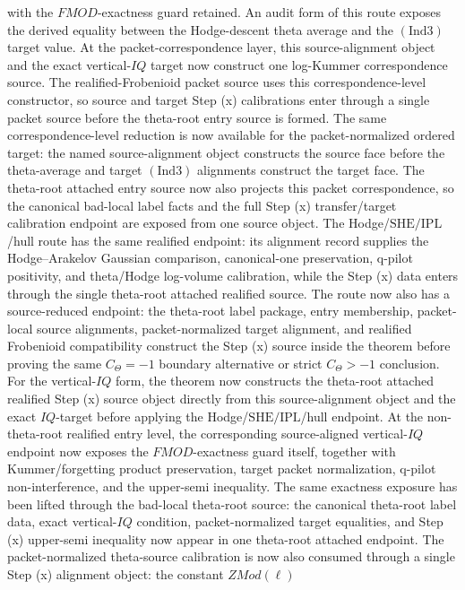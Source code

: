 \documentclass[11pt]{article}
\newcommand{\Ind}{\ensuremath{\mathrm{Ind}}}
\newcommand{\SHE}{\ensuremath{\mathrm{SHE}}}
\newcommand{\IPL}{\ensuremath{\mathrm{IPL}}}
\theoremstyle{plain}
\theoremstyle{definition}
\theoremstyle{remark}
\begin{document}
with the \(FMOD\)-exactness guard retained.
An audit form of this route exposes the derived equality between the
Hodge-descent theta average and the \((\Ind3)\) target value.
At the packet-correspondence layer, this source-alignment object and the exact
vertical-\(IQ\) target now construct one log-Kummer correspondence source.  The
realified-Frobenioid packet source uses this correspondence-level constructor,
so source and target Step (x) calibrations enter through a single packet source
before the theta-root entry source is formed.
The same correspondence-level reduction is now available for the
packet-normalized ordered target: the named source-alignment object constructs
the source face before the theta-average and target \((\Ind3)\) alignments
construct the target face.
The theta-root attached entry source now also projects this packet
correspondence, so the canonical bad-local label facts and the full Step (x)
transfer/target calibration endpoint are exposed from one source object.
The Hodge/\(\SHE/\IPL\)/hull route has the same realified endpoint: its
alignment record supplies the Hodge--Arakelov Gaussian comparison,
canonical-one preservation, q-pilot positivity, and theta/Hodge log-volume
calibration, while the Step (x) data enters through the single theta-root
attached realified source.
The route now also has a source-reduced endpoint: the theta-root label package,
entry membership, packet-local source alignments, packet-normalized target
alignment, and realified Frobenioid compatibility construct the Step (x) source
inside the theorem before proving the same \(C_\Theta=-1\) boundary alternative
or strict \(C_\Theta>-1\) conclusion.
For the vertical-\(IQ\) form, the theorem now constructs the theta-root
attached realified Step (x) source object directly from this source-alignment
object and the exact \(IQ\)-target before applying the
Hodge/\(\SHE/\IPL\)/hull endpoint.
At the non-theta-root realified entry level, the corresponding source-aligned
vertical-\(IQ\) endpoint now exposes the \(FMOD\)-exactness guard itself,
together with Kummer/forgetting product preservation, target packet
normalization, q-pilot non-interference, and the upper-semi inequality.
The same exactness exposure has been lifted through the bad-local theta-root
source: the canonical theta-root label data, exact vertical-\(IQ\) condition,
packet-normalized target equalities, and Step (x) upper-semi inequality now
appear in one theta-root attached endpoint.
The packet-normalized theta-source calibration is now also consumed through a
single Step (x) alignment object: the constant \(ZMod(\ell)\)
\end{document}
